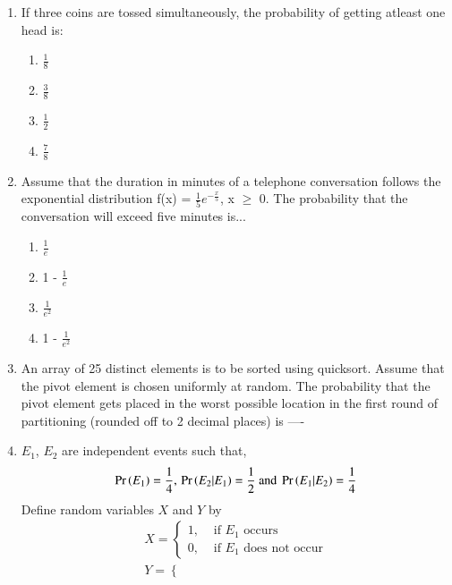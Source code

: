 \documentclass[journal,12pt,twocolumn]{IEEEtran}
\begin{document}
\begin{enumerate}
%
\solution

%
\item If three coins are tossed simultaneously, the probability of getting atleast one head is:\\
\begin{enumerate}
    \item $\frac{1}{8}$
    \newline
    \item $\frac{3}{8}$
    \newline
    \item $\frac{1}{2}$
    \newline
    \item $\frac{7}{8}$
\end{enumerate}
%
\solution

%
\item Assume that the duration in minutes of a telephone conversation follows the exponential distribution f(x) = $\frac{1}{5}e^{-\frac{x}{5}}$, x $\ge$ 0. The probability that the conversation will exceed five minutes is...
\begin{enumerate}
\item $\frac{1}{e}$ 
\item 1 - $\frac{1}{e}$ 
\item $\frac{1}{e^2}$ 
\item 1 - $\frac{1}{e^2}$
\end{enumerate}
%
%
\solution

%
\item  An array of 25 distinct elements is to be sorted using quicksort. Assume that the pivot element is chosen uniformly at random. The probability that the pivot element gets placed in the worst possible location in the first round of partitioning (rounded off to 2 decimal places) is ----
%
\solution

%
\item $E_1$, $E_2$ are independent events such that,
\begin{align*}
    \Pr\left(E_1\right) = \frac{1}{4},\,\Pr\left(E_2|E_1\right) = \frac{1}{2} \text{ and } \Pr\left(E_1|E_2\right) = \frac{1}{4}
\end{align*}
Define random variables $X$ and $Y$ by\\
\begin{align}
X=
\begin{cases}
1, &\text{ if $E_1$ occurs}\\
0, &\text{ if $E_1$ does not occur}
\end{cases}
\\
Y=
\begin{cases}

\end{cases}
\end{align}
\end{enumerate}
\end{document}

